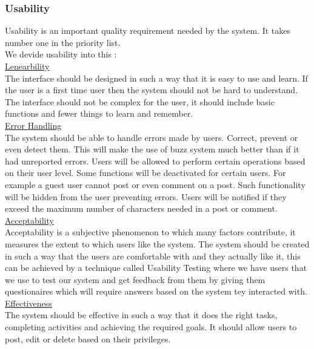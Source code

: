 \subsubsection{Usability}
Usability is an important quality requirement needed by the system. It takes number one in the priority list. \\

We devide usability into this :\\

\underline{Lenearbility}\\

The interface should be designed in such a way that it is easy to use and learn. If the user is a first time user then the system should not be hard to understand. 
The interface should not be complex for the user, it should include basic functions and fewer things to learn and remember.\\

\underline{Error Handling}\\

The system should be able to handle errors made by users. Correct, prevent or even detect them. This will make the use of buzz system much better than  if it had unreported errors.
Users will be allowed to perform certain operations based on their user level. Some functions will be deactivated for certain users. 
For example a guest user cannot post or even comment on a post. Such functionality will be hidden from the user preventing errors. 
Users will be notified if they exceed the maximum number of characters needed in a post or comment.\\


\underline{Acceptability} \\

Acceptability is a subjective phenomenon to which many factors contribute, it measures the extent to which users like the system. 
The system should be created in such a way that the users are comfortable with and they actually like it, this can be achieved by  a technique called Usability Testing where  we have users that we use to test our system and get feedback from them by giving them questionaires which will require answers based on the system tey interacted with.\\


\underline{Effectiveness} \\
The system should be effective in such a way that it does the right tasks, completing activities and achieving the required goals. It should allow users to post, edit or delete based on their privileges.\\

